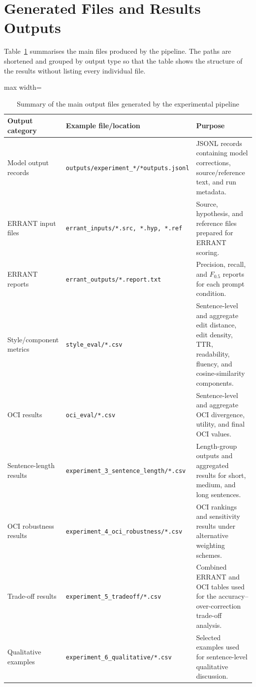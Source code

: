\section{Generated Files and Results Outputs}
\label{app:generated-files}

Table~\ref{tab:appendix_outputs} summarises the main files produced by the pipeline. The paths are shortened and grouped by output type so that the table shows the structure of the results without listing every individual file.

\begin{table}[htbp]
    \centering
    \caption{Summary of the main output files generated by the experimental pipeline}
    \label{tab:appendix_outputs}
    \renewcommand{\arraystretch}{1.12}
    \begin{adjustbox}{max width=\textwidth}
    \begin{tabular}{p{}p{}p{}}
        \toprule
        \textbf{Output category} & \textbf{Example file/location} & \textbf{Purpose} \\
        \midrule
        Model output records & \texttt{outputs/experiment\_*/*outputs.jsonl} & JSONL records containing model corrections, source/reference text, and run metadata. \\
        ERRANT input files & \texttt{errant\_inputs/*.src, *.hyp, *.ref} & Source, hypothesis, and reference files prepared for ERRANT scoring. \\
        ERRANT reports & \texttt{errant\_outputs/*.report.txt} & Precision, recall, and $F_{0.5}$ reports for each prompt condition. \\
        Style/component metrics & \texttt{style\_eval/*.csv} & Sentence-level and aggregate edit distance, edit density, TTR, readability, fluency, and cosine-similarity components. \\
        OCI results & \texttt{oci\_eval/*.csv} & Sentence-level and aggregate OCI divergence, utility, and final OCI values. \\
        Sentence-length results & \texttt{experiment\_3\_sentence\_length/*.csv} & Length-group outputs and aggregated results for short, medium, and long sentences. \\
        OCI robustness results & \texttt{experiment\_4\_oci\_robustness/*.csv} & OCI rankings and sensitivity results under alternative weighting schemes. \\
        Trade-off results & \texttt{experiment\_5\_tradeoff/*.csv} & Combined ERRANT and OCI tables used for the accuracy--over-correction trade-off analysis. \\
        Qualitative examples & \texttt{experiment\_6\_qualitative/*.csv} & Selected examples used for sentence-level qualitative discussion. \\
        \bottomrule
    \end{tabular}
    \end{adjustbox}
\end{table}

